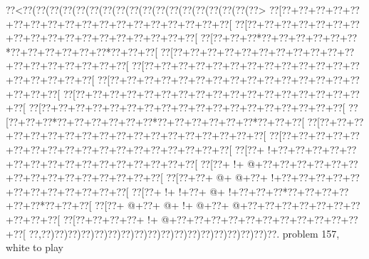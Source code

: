 \vbox{\vbox{\goo
\0??<\0??(\0??(\0??(\0??(\0??(\0??(\0??(\0??(\0??(\0??(\0??(\0??(\0??(\0??(\0??(\0??(\0??(\0??>
\0??[\0??+\0??+\0??+\0??+\0??+\0??+\0??+\0??+\0??+\0??+\0??+\0??+\0??+\0??+\0??+\0??+\0??+\0??[
\0??[\0??+\0??+\0??+\0??+\0??+\0??+\0??+\0??+\0??+\0??+\0??+\0??+\0??+\0??+\0??+\0??+\0??+\0??[
\0??[\0??+\0??+\0??*\0??+\0??+\0??+\0??+\0??+\0??*\0??+\0??+\0??+\0??+\0??+\0??*\0??+\0??+\0??[
\0??[\0??+\0??+\0??+\0??+\0??+\0??+\0??+\0??+\0??+\0??+\0??+\0??+\0??+\0??+\0??+\0??+\0??+\0??[
\0??[\0??+\0??+\0??+\0??+\0??+\0??+\0??+\0??+\0??+\0??+\0??+\0??+\0??+\0??+\0??+\0??+\0??+\0??[
\0??[\0??+\0??+\0??+\0??+\0??+\0??+\0??+\0??+\0??+\0??+\0??+\0??+\0??+\0??+\0??+\0??+\0??+\0??[
\0??[\0??+\0??+\0??+\0??+\0??+\0??+\0??+\0??+\0??+\0??+\0??+\0??+\0??+\0??+\0??+\0??+\0??+\0??[
\0??[\0??+\0??+\0??+\0??+\0??+\0??+\0??+\0??+\0??+\0??+\0??+\0??+\0??+\0??+\0??+\0??+\0??+\0??[
\0??[\0??+\0??+\0??*\0??+\0??+\0??+\0??+\0??+\0??*\0??+\0??+\0??+\0??+\0??+\0??*\0??+\0??+\0??[
\0??[\0??+\0??+\0??+\0??+\0??+\0??+\0??+\0??+\0??+\0??+\0??+\0??+\0??+\0??+\0??+\0??+\0??+\0??[
\0??[\0??+\0??+\0??+\0??+\0??+\0??+\0??+\0??+\0??+\0??+\0??+\0??+\0??+\0??+\0??+\0??+\0??+\0??[
\0??[\0??+\- !+\0??+\0??+\0??+\0??+\0??+\0??+\0??+\0??+\0??+\0??+\0??+\0??+\0??+\0??+\0??+\0??[
\0??[\0??+\- !+\- @+\0??+\0??+\0??+\0??+\0??+\0??+\0??+\0??+\0??+\0??+\0??+\0??+\0??+\0??+\0??[
\0??[\0??+\0??+\- @+\- @+\0??+\- !+\0??+\0??+\0??+\0??+\0??+\0??+\0??+\0??+\0??+\0??+\0??+\0??[
\0??[\0??+\- !+\- !+\0??+\- @+\- !+\0??+\0??+\0??*\0??+\0??+\0??+\0??+\0??+\0??*\0??+\0??+\0??[
\0??[\0??+\- @+\0??+\- @+\- !+\- @+\0??+\- @+\0??+\0??+\0??+\0??+\0??+\0??+\0??+\0??+\0??+\0??[
\0??[\0??+\0??+\0??+\0??+\- !+\- @+\0??+\0??+\0??+\0??+\0??+\0??+\0??+\0??+\0??+\0??+\0??+\0??[
\0??,\0??)\0??)\0??)\0??)\0??)\0??)\0??)\0??)\0??)\0??)\0??)\0??)\0??)\0??)\0??)\0??)\0??)\0??.
}
\hfil problem 157, white to play\hfil\break
}

